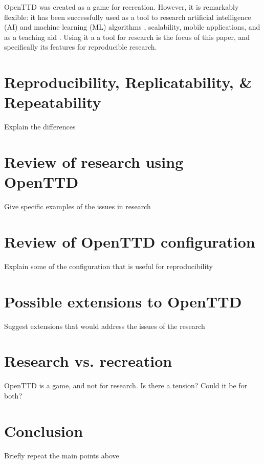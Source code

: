 \documentclass[twocolumn]{article}
\begin{document}
OpenTTD was created as a game for recreation. However, it is remarkably flexible: it has been successfully used as a tool to research artificial intelligence (AI) and machine learning (ML) algorithms \cite{wisniewski2011artificial, rios2009trains, bijlsma2014evolving}, scalability, mobile applications, and as a teaching aid \cite{HansenMuprhie2018}. Using it a a tool for research is the focus of this paper, and specifically its features for reproducible research.

\section{Reproducibility, Replicatability, \& Repeatability}
\begin{YStkyNote}
Explain the differences
\end{YStkyNote}

\section{Review of research using OpenTTD}

\begin{YStkyNote}
Give specific examples of the issues in research
\end{YStkyNote}

\section{Review of OpenTTD configuration}

\begin{YStkyNote}
Explain some of the configuration that is useful for reproducibility
\end{YStkyNote}

\section{Possible extensions to OpenTTD}

\begin{YStkyNote}
Suggest extensions that would address the issues of the research
\end{YStkyNote}

\section{Research vs. recreation}

\begin{YStkyNote}
OpenTTD is a game, and not for research. Is there a tension? Could it be for both?
\end{YStkyNote}

\section{Conclusion}

\begin{YStkyNote}
Briefly repeat the main points above
\end{YStkyNote}

\normalsize


\end{document}

